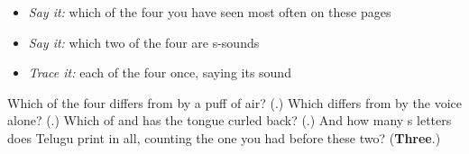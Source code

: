 \begin{itemize}
\raggedright
  \item \emph{Say it:} which of the four you have seen most often on these pages
  \item \emph{Say it:} which two of the four are s-sounds
  \item \emph{Trace it:} each of the four once, saying its sound
\end{itemize}

\begin{tcolorbox}[breakable,colback=teal!4,colframe=teal!35!black,title={Before you move on}]
Which of the four differs from  by a puff of air? (\textbf{}.) Which differs from  by the voice alone? (\textbf{}.) Which of  and  has the tongue curled back? (\textbf{}.) And how many s letters does Telugu print in all, counting the one you had before these two? (\textbf{Three}.)
\end{tcolorbox}
